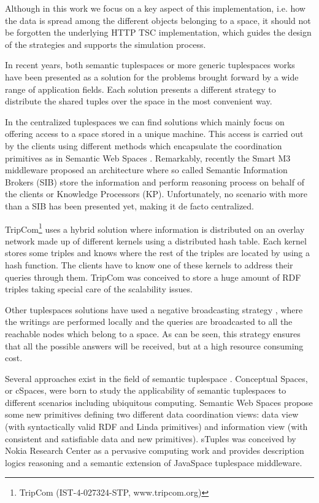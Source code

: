 Although in this work we focus on a key aspect of this implementation, i.e. how the data is spread among the different
objects belonging to a space, it should not be forgotten the underlying HTTP TSC implementation, which guides the design
of the strategies and supports the simulation process.







In recent years, both semantic tuplespaces or more generic tuplespaces works have been presented as a solution for the
problems brought forward by a wide range of application fields. Each solution presents a different strategy to
distribute the shared tuples over the space in the most convenient way.

In the centralized tuplespaces we can find solutions which mainly focus on offering access to a space stored in a unique
machine. This access is carried out by the clients using different methods which encapsulate the coordination primitives
as in Semantic Web Spaces \cite{nixon_towards_2007}. Remarkably, recently the Smart M3 middleware proposed an
architecture where so called Semantic Information Brokers (SIB) store the information and perform reasoning
process on behalf of the clients or Knowledge Processors (KP). Unfortunately, no scenario with more than a SIB has been
presented yet, making it de facto centralized.

TripCom\footnote{TripCom (IST-4-027324-STP, www.tripcom.org)} uses a hybrid solution where information is distributed on
an overlay network made up of different kernels using a distributed hash table. Each kernel stores some triples and
knows where the rest of the triples are located by using a hash function. The clients have to know one of these
kernels to address their queries through them. TripCom was conceived to store a huge amount of RDF triples taking
special care of the scalability issues.

Other tuplespaces solutions have used a negative broadcasting strategy
\cite{krummenacher_open_2009,murphy_transiently_2006,gomez-goiri_semantic_2011}, where the writings are
performed locally and the queries are broadcasted to all the reachable nodes which belong to a space. As can be seen,
this strategy ensures that all the possible answers will be received, but at a high resource consuming cost.


Several approaches exist in the field of semantic tuplespace \cite{nixon_tuplespace-based_2008}.
Conceptual Spaces, or cSpaces, were born to study the applicability of semantic tuplespaces to different scenarios
including ubiquitous computing. Semantic Web Spaces propose some new primitives defining
two different data coordination views: data view (with syntactically valid RDF and Linda primitives) and information view
(with consistent and satisfiable data and new primitives). sTuples was conceived by Nokia Research Center as a pervasive
computing work and provides description logics reasoning and a semantic extension of JavaSpace tuplespace middleware.

